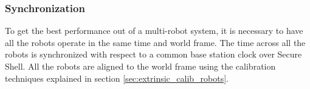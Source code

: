 \documentclass[10pt,twocolumn,letterpaper]{article}
\begin{document}




\subsubsection{Synchronization}
To get the best performance out of a multi-robot system, it is necessary to have all the robots operate in the same time and world frame. The time across all the robots is synchronized with respect to a common base station clock over Secure Shell. All the robots are aligned to the world frame using the calibration techniques explained in section \ref{sec:extrinsic_calib_robots}.

\end{document}
